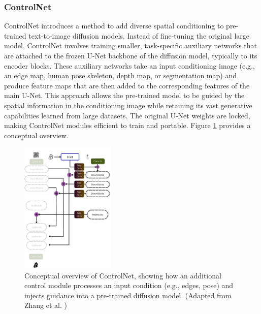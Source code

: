 \subsubsection{ControlNet}
ControlNet \cite{controlnet} introduces a method to add diverse spatial conditioning to pre-trained text-to-image diffusion models. Instead of fine-tuning the original large model, ControlNet involves training smaller, task-specific auxiliary networks that are attached to the frozen U-Net backbone of the diffusion model, typically to its encoder blocks. These auxiliary networks take an input conditioning image (e.g., an edge map, human pose skeleton, depth map, or segmentation map) and produce feature maps that are then added to the corresponding features of the main U-Net. This approach allows the pre-trained model to be guided by the spatial information in the conditioning image while retaining its vast generative capabilities learned from large datasets. The original U-Net weights are locked, making ControlNet modules efficient to train and portable. Figure \ref{fig:controlnet-overview} provides a conceptual overview.

\begin{figure}[ht]
  \centering
  \includegraphics[width=0.4\textwidth]{images/related-work/controlnet.png}
  \caption{Conceptual overview of ControlNet, showing how an additional control module processes an input condition (e.g., edges, pose) and injects guidance into a pre-trained diffusion model. (Adapted from Zhang et al. \cite{controlnet})}
  \label{fig:controlnet-overview}
\end{figure}

